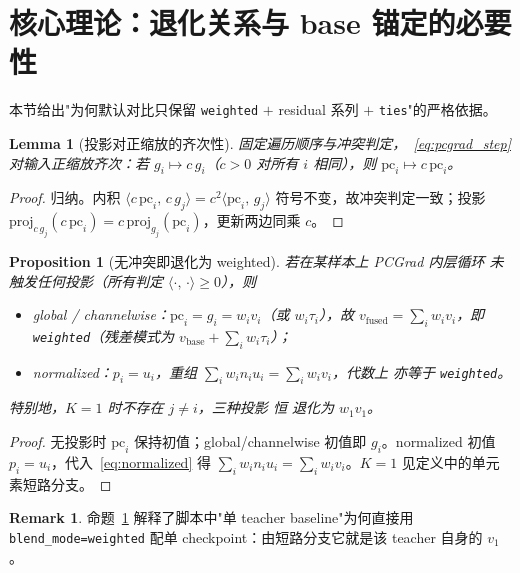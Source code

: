 \documentclass[11pt,a4paper]{article}
\newcommand{\vb}{v_{\mathrm{base}}}
\newcommand{\vfused}{v_{\mathrm{fused}}}
\newcommand{\inner}[2]{\langle #1,\, #2\rangle}
\newcommand{\proj}[2]{\mathrm{proj}_{#2}\!\left(#1\right)}
\theoremstyle{plain}
\newtheorem{proposition}{Proposition}
\newtheorem{lemma}{Lemma}
\theoremstyle{definition}
\newtheorem{remark}{Remark}
\begin{document}
\section{核心理论：退化关系与 base 锚定的必要性}

本节给出"为何默认对比只保留 \texttt{weighted} $+$ residual 系列 $+$ \texttt{ties}"的严格依据。

\begin{lemma}[投影对正缩放的齐次性]
\label{lem:homog}
固定遍历顺序与冲突判定，~\eqref{eq:pcgrad_step} 对输入正缩放齐次：若 $g_i\mapsto c\,g_i$（$c>0$ 对所有 $i$ 相同），则 $\mathrm{pc}_i\mapsto c\,\mathrm{pc}_i$。
\end{lemma}
\begin{proof}
归纳。内积 $\inner{c\,\mathrm{pc}_i}{c\,g_j}=c^2\inner{\mathrm{pc}_i}{g_j}$ 符号不变，故冲突判定一致；投影 $\proj{c\,\mathrm{pc}_i}{c\,g_j}=c\,\proj{\mathrm{pc}_i}{g_j}$，更新两边同乘 $c$。
\end{proof}

\begin{proposition}[无冲突即退化为 weighted]
\label{prop:noconflict}
若在某样本上 PCGrad 内层循环 \emph{未触发任何投影}（所有判定 $\inner{\cdot}{\cdot}\ge0$），则
\begin{itemize}[leftmargin=1.6em]
\item global / channelwise：$\mathrm{pc}_i=g_i=w_i v_i$（或 $w_i\tau_i$），故 $\vfused=\sum_i w_i v_i$，即 \texttt{weighted}（残差模式为 $\vb+\sum_i w_i\tau_i$）；
\item normalized：$p_i=u_i$，重组 $\sum_i w_i n_i u_i=\sum_i w_i v_i$，\emph{代数上} 亦等于 \texttt{weighted}。
\end{itemize}
特别地，$K=1$ 时不存在 $j\neq i$，三种投影 \emph{恒} 退化为 $w_1 v_1$。
\end{proposition}
\begin{proof}
无投影时 $\mathrm{pc}_i$ 保持初值；global/channelwise 初值即 $g_i$。normalized 初值 $p_i=u_i$，代入~\eqref{eq:normalized} 得 $\sum_i w_i n_i u_i=\sum_i w_i v_i$。$K=1$ 见定义中的单元素短路分支。
\end{proof}

\begin{remark}
命题~\ref{prop:noconflict} 解释了脚本中"单 teacher baseline"为何直接用 \texttt{blend\_mode=weighted} 配单 checkpoint：由短路分支它就是该 teacher 自身的 $v_1$。
\end{remark}
\end{document}
